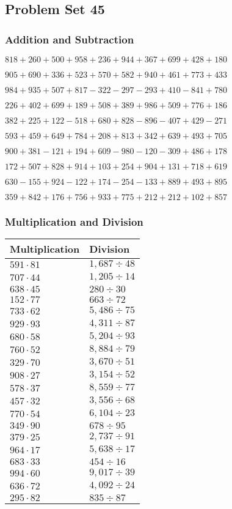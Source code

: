 \hypertarget{problem-set-45-1}{%
\subsection{Problem Set 45}\label{problem-set-45-1}}

\hypertarget{addition-and-subtraction-145}{%
\subsubsection{Addition and
Subtraction}\label{addition-and-subtraction-145}}

\(818 + 260 + 500 + 958 + 236 + 944 + 367 + 699 + 428 + 180\)

\(905 + 690 + 336 + 523 + 570 + 582 + 940 + 461 + 773 + 433\)

\(984 + 935 + 507 + 817 - 322 - 297 - 293 + 410 - 841 + 780\)

\(226 + 402 + 699 + 189 + 508 + 389 + 986 + 509 + 776 + 186\)

\(382 + 225 + 122 - 518 + 680 + 828 - 896 - 407 + 429 - 271\)

\(593 + 459 + 649 + 784 + 208 + 813 + 342 + 639 + 493 + 705\)

\(900 + 381 - 121 + 194 + 609 - 980 - 120 - 309 + 486 + 178\)

\(172 + 507 + 828 + 914 + 103 + 254 + 904 + 131 + 718 + 619\)

\(630 - 155 + 924 - 122 + 174 - 254 - 133 + 889 + 493 + 895\)

\(359 + 842 + 176 + 756 + 933 + 775 + 212 + 212 + 102 + 857\)

\hypertarget{multiplication-and-division-145}{%
\subsubsection{Multiplication and
Division}\label{multiplication-and-division-145}}

\begin{longtable}[]{@{}ll@{}}
\toprule
Multiplication & Division\tabularnewline
\midrule
\endhead
\(591 \cdot 81\) & \(1,687÷48\)\tabularnewline
\(707 \cdot 44\) & \(1,205÷14\)\tabularnewline
\(638 \cdot 45\) & \(280÷30\)\tabularnewline
\(152 \cdot 77\) & \(663÷72\)\tabularnewline
\(733 \cdot 62\) & \(5,486÷75\)\tabularnewline
\(929 \cdot 93\) & \(4,311÷87\)\tabularnewline
\(680 \cdot 58\) & \(5,204÷93\)\tabularnewline
\(760 \cdot 52\) & \(8,884÷79\)\tabularnewline
\(329 \cdot 70\) & \(3,670÷51\)\tabularnewline
\(908 \cdot 27\) & \(3,154÷52\)\tabularnewline
\(578 \cdot 37\) & \(8,559÷77\)\tabularnewline
\(457 \cdot 32\) & \(3,556÷68\)\tabularnewline
\(770 \cdot 54\) & \(6,104÷23\)\tabularnewline
\(349 \cdot 90\) & \(678÷95\)\tabularnewline
\(379 \cdot 25\) & \(2,737÷91\)\tabularnewline
\(964 \cdot 17\) & \(5,638÷17\)\tabularnewline
\(683 \cdot 33\) & \(454÷16\)\tabularnewline
\(994 \cdot 60\) & \(9,017÷39\)\tabularnewline
\(636 \cdot 72\) & \(4,092÷24\)\tabularnewline
\(295 \cdot 82\) & \(835÷87\)\tabularnewline
\bottomrule
\end{longtable}

